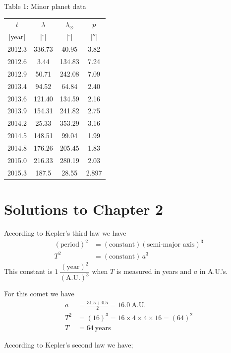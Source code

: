 \begin{center}
Table 1: Minor planet data

\begin{tabular}{cccc}
\hline
$t$ & $\lambda$ & $\lambda_\odot$ & $p$ \\
{[year]} & {[$^\circ$]} & {[$^\circ$]} & {[$''$]} \\
\hline
2012.3 & 336.73 & 40.95 & 3.82 \\
2012.6 & 3.44 & 134.83 & 7.24 \\
2012.9 & 50.71 & 242.08 & 7.09 \\
2013.4 & 94.52 & 64.84 & 2.40 \\
2013.6 & 121.40 & 134.59 & 2.16 \\
2013.9 & 154.31 & 241.82 & 2.75 \\
2014.2 & 25.33 & 353.29 & 3.16 \\
2014.5 & 148.51 & 99.04 & 1.99 \\
2014.8 & 176.26 & 205.45 & 1.83 \\
2015.0 & 216.33 & 280.19 & 2.03 \\
2015.3 & 187.5 & 28.55 & 2.897 \\
\hline
\end{tabular}
\end{center}

\clearpage
\section*{Solutions to Chapter 2}

According to Kepler's third law we have
\begin{align*}
  (\text{period})^2 &= (\text{constant})(\text{semi-major axis})^3 \\
  T^2 &= (\text{constant})\,a^3
\end{align*}
This constant is $1\,\dfrac{(\text{year})^2}{(\text{A.U.})^3}$ when $T$ is
measured in years and $a$ in A.U.'s.

For this comet we have
\begin{align*}
  a &= \frac{31.5 + 0.5}{2} = 16.0\ \text{A.U.} \\
  T^2 &= (16)^3 = 16 \times 4 \times 4 \times 16 = (64)^2 \\
  T &= 64\ \text{years}
\end{align*}

According to Kepler's second law we have;

